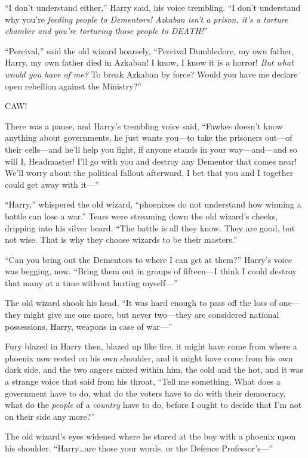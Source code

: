 “I don’t understand either,” Harry said, his voice trembling. “I don’t understand why you’re \emph{feeding people to Dementors! Azkaban isn’t a prison, it’s a torture chamber and you’re torturing those people to DEATH!}”

“Percival,” said the old wizard hoarsely, “Percival Dumbledore, my own father, Harry, my own father died in Azkaban! I know, I know it is a horror! \emph{But what would you have of me?} To break Azkaban by force? Would you have me declare open rebellion against the Ministry?”

CAW!

There was a pause, and Harry’s trembling voice said, “Fawkes doesn’t know anything about governments, he just wants you—to take the prisoners out—of their cells—and he’ll help you fight, if anyone stands in your way—and—and so will I, Headmaster! I’ll go with you and destroy any Dementor that comes near! We’ll worry about the political fallout afterward, I bet that you and I together could get away with it—”

“Harry,” whispered the old wizard, “phoenixes do not understand how winning a battle can lose a war.” Tears were streaming down the old wizard’s cheeks, dripping into his silver beard. “The battle is all they know. They are good, but not wise. That is why they choose wizards to be their masters.”

“Can you bring out the Dementors to where I can get at them?” Harry’s voice was begging, now. “Bring them out in groups of fifteen—I think I could destroy that many at a time without hurting myself—”

The old wizard shook his head. “It was hard enough to pass off the loss of one—they might give me one more, but never two—they are considered national possessions, Harry, weapons in case of war—”

Fury blazed in Harry then, blazed up like fire, it might have come from where a phoenix now rested on his own shoulder, and it might have come from his own dark side, and the two angers mixed within him, the cold and the hot, and it was a strange voice that said from his throat, “Tell me something. What does a government have to do, what do the voters have to do with their democracy, what do the \emph{people} of a \emph{country} have to do, before I ought to decide that I’m not on their side any more?”

The old wizard’s eyes widened where he stared at the boy with a phoenix upon his shoulder. “Harry…are those your words, or the Defence Professor’s—”

